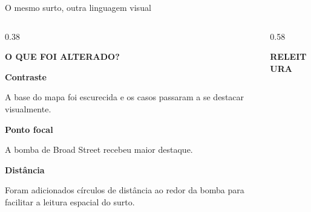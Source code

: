 \documentclass[aspectratio=169,11pt]{beamer}
\begin{document}
\begin{frame}{O mesmo surto, outra linguagem visual}

    \vspace{0.05cm}

    \begin{columns}[T,onlytextwidth]


        \begin{column}{0.38\textwidth}

            {\color{Sepia}
            \small
            \textbf{O QUE FOI ALTERADO?}}

            \vspace{0.30cm}

            {\color{AzulEscuro}
            \textbf{Contraste}}

            \vspace{0.08cm}

            {\small
            A base do mapa foi escurecida e os casos
            passaram a se destacar visualmente.
            }

            \vspace{0.35cm}

            {\color{AzulEscuro}
            \textbf{Ponto focal}}

            \vspace{0.08cm}

            {\small
            A bomba de Broad Street recebeu maior
            destaque.
            }

            \vspace{0.35cm}

            {\color{AzulEscuro}
            \textbf{Distância}}

            \vspace{0.08cm}

            {\small
            Foram adicionados círculos de distância
            ao redor da bomba para facilitar a leitura
            espacial do surto.
            }

        \end{column}


        \begin{column}{0.58\textwidth}

            {\color{AzulMedio}
            \small
            \textbf{RELEITURA}}

            \vspace{0.15cm}

            \centering


\end{column}
\end{columns}
\end{frame}
\end{document}
